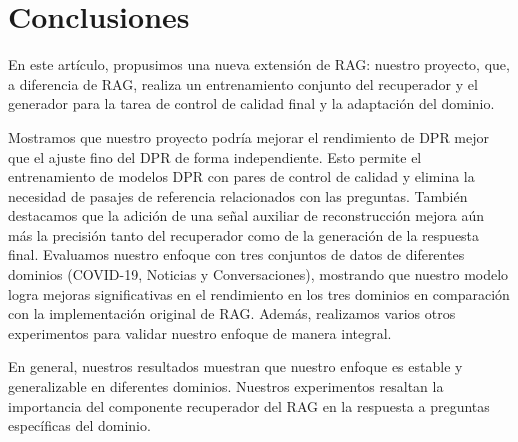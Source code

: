 \documentclass{article}
\begin{document}
\section{Conclusiones}

En este artículo, propusimos una nueva extensión de RAG: nuestro proyecto, que, a diferencia de RAG, realiza un entrenamiento conjunto del recuperador y el generador para la tarea de control de calidad final y la adaptación del dominio.

Mostramos que nuestro proyecto podría mejorar el rendimiento de DPR mejor que el ajuste fino del DPR de forma independiente. Esto permite el entrenamiento de modelos DPR con pares de control de calidad y elimina la necesidad de pasajes de referencia relacionados con las preguntas. También destacamos que la adición de una señal auxiliar de reconstrucción mejora aún más la precisión tanto del recuperador como de la generación de la respuesta final. Evaluamos nuestro enfoque con tres conjuntos de datos de diferentes dominios (COVID-19, Noticias y Conversaciones), mostrando que nuestro modelo logra mejoras significativas en el rendimiento en los tres dominios en comparación con la implementación original de RAG. Además, realizamos varios otros experimentos para validar nuestro enfoque de manera integral.

En general, nuestros resultados muestran que nuestro enfoque es estable y generalizable en diferentes dominios. Nuestros experimentos resaltan la importancia del componente recuperador del RAG en la respuesta a preguntas específicas del dominio.
\end{document}

